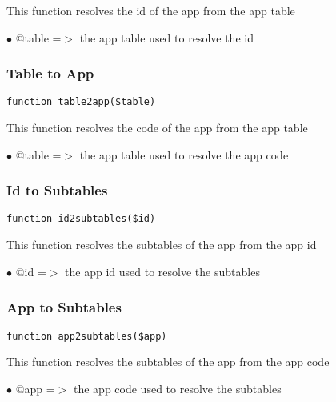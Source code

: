 \documentclass[a4paper]{article}
\begin{document}
This function resolves the id of the app from the app table

\begin{compactitem}
\item[\color{myblue}$\bullet$] @table =$>$ the app table used to resolve the id
\end{compactitem}

\hypertarget{toc23}{}
\subsubsection{Table to App}

\begin{lstlisting}
function table2app($table)
\end{lstlisting}

This function resolves the code of the app from the app table

\begin{compactitem}
\item[\color{myblue}$\bullet$] @table =$>$ the app table used to resolve the app code
\end{compactitem}

\hypertarget{toc24}{}
\subsubsection{Id to Subtables}

\begin{lstlisting}
function id2subtables($id)
\end{lstlisting}

This function resolves the subtables of the app from the app id

\begin{compactitem}
\item[\color{myblue}$\bullet$] @id =$>$ the app id used to resolve the subtables
\end{compactitem}

\hypertarget{toc25}{}
\subsubsection{App to Subtables}

\begin{lstlisting}
function app2subtables($app)
\end{lstlisting}

This function resolves the subtables of the app from the app code

\begin{compactitem}
\item[\color{myblue}$\bullet$] @app =$>$ the app code used to resolve the subtables
\end{compactitem}
\end{document}

